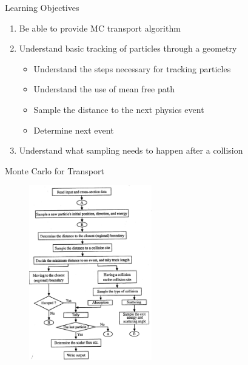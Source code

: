 \documentclass[xcolor=x11names,compress]{beamer}
\renewcommand{\(}{\begin{columns}}
\renewcommand{\)}{\end{columns}}
\newcommand{\<}[1]{\begin{column}{#1}}
\renewcommand{\>}{\end{column}}
\begin{document}
\begin{frame}{Learning Objectives}

    \begin{enumerate}
    \item Be able to provide MC transport algorithm
    \item Understand basic tracking of particles through a geometry
      \begin{itemize}
      \item Understand the steps necessary for tracking particles
      \item Understand the use of mean free path
      \item Sample the distance to the next physics event
      \item Determine next event
      \end{itemize}
    \item Understand what sampling needs to happen after a collision
    \end{enumerate}

\end{frame}


\begin{frame}{Monte Carlo for Transport}

  	\begin{figure}
  	\begin{center}
  		\includegraphics[height=3in,clip]{MC-algorithm}
	\end{center}
  	\end{figure}
  	
\end{frame}
\end{document}
